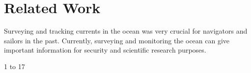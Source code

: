 \section[RelatedWork]{Related Work}

Surveying and tracking currents in the ocean was very crucial for navigators and sailors in the past.
Currently, surveying and monitoring the ocean can give important information for security and scientific research purposes.

1 to 17


